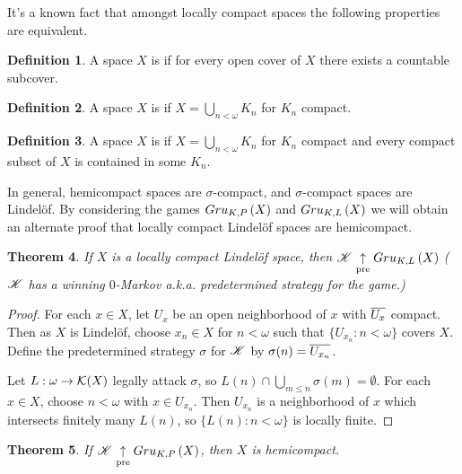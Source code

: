 \documentclass{amsart}
\newtheorem{theorem}{Theorem}[section]
\theoremstyle{definition}
\newtheorem{definition}[theorem]{Definition}
\begin{document}
It's a known fact \cite{MR2048350} that amongst locally compact spaces the
following properties are equivalent.

\begin{definition}
  A space \(X\) is  if for every open cover of \(X\) there
  exists a countable subcover.
\end{definition}

\begin{definition}
  A space \(X\) is  if \(X=\bigcup_{n<\omega}K_n\)
  for \(K_n\) compact.
\end{definition}

\begin{definition}
  A space \(X\) is  if \(X=\bigcup_{n<\omega}K_n\)
  for \(K_n\) compact and every compact subset of \(X\) is contained in some
  \(K_n\).
\end{definition}

In general, hemicompact spaces are \(\sigma\)-compact, and \(\sigma\)-compact
spaces are Lindel\"of. By considering the games \(Gru_{K,P}\left({X}\right)\) and
\(Gru_{K,L}\left({X}\right)\) we will obtain an alternate proof that locally compact
Lindel\"of spaces are hemicompact.

\begin{theorem}
  If \(X\) is a locally compact Lindel\"of space, then
  \(\mathscr{K} \underset{\text{pre}}{\uparrow} Gru_{K,L}\left({X}\right)\) (\(\mathscr{K}\) has a winning \(0\)-Markov
  a.k.a. predetermined strategy for the game.)
\end{theorem}

\begin{proof}
  For each \(x\in X\), let \(U_x\) be an open neighborhood of \(x\) with \(\overline{U_x}\)
  compact. Then as \(X\) is Lindel\"of, choose \(x_n\in X\) for \(n<\omega\) such that
  \(\{U_{x_n}:n<\omega\}\) covers \(X\). Define the predetermined strategy \(\sigma\)
  for \(\mathscr{K}\) by \(\sigma(n)=\overline{U_{x_n}}\).

  Let \(L:\omega\to \mathcal{K}(X)\) legally attack \(\sigma\), so
  \(L(n)\cap\bigcup_{m\leq n}\sigma(m)=\emptyset\). For each \(x\in X\),
  choose \(n<\omega\) with \(x\in U_{x_n}\). Then \(U_{x_n}\) is a neighborhood of
  \(x\) which intersects finitely many \(L(n)\), so \(\{L(n):n<\omega\}\) is
  locally finite.
\end{proof}

\begin{theorem}
  If \(\mathscr{K}\underset{\text{pre}}{\uparrow} Gru_{K,P}\left({X}\right)\), then \(X\) is hemicompact.
\end{theorem}
\end{document}
